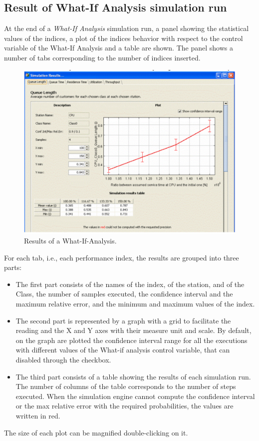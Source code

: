 \subsection{Result of What-If Analysis simulation run}
At the end of a \emph{What-If Analysis} simulation run, a panel
showing the statistical values of the indices, a plot of the
indices behavior with respect to the control variable of the
What-If Analysis and a table are shown. The panel shows a number
of tabs
corresponding to the number of indices inserted.\\
\begin{figure}[htb]
    \begin{center}
        \includegraphics[scale=.5]{img/jsimg/11.3.eps}
    \end{center}
    \caption{Results of a What-If-Analysis.}
    \label{fig:reswia}
\end{figure}
For each tab, i.e., each performance index, the results are
grouped into three parts:
\begin{itemize}
\item  The first part consists of the names of the index, of the
station, and of the Class, the number of samples executed, the
confidence interval and the maximum relative error, and the
minimum and maximum values of the index.

\item   The second part is represented by a graph with a grid to
facilitate the reading and the X and Y axes with their measure
unit and scale. By default, on the graph are plotted the
confidence interval range for all the executions with different
values of the What-if analysis control variable, that can disabled
through the checkbox.

\item  The third part consists of a table showing the results of
each simulation run. The number of columns of the table
corresponds to the number of steps executed. When the simulation
engine cannot compute the confidence interval or the max relative
error with the required probabilities, the values are written in
red.
\end{itemize}
The size of each plot can be magnified double-clicking on it.

